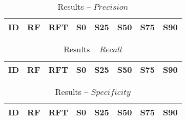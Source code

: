 \documentclass{llncs}
\begin{document}
\begin{table}[!ht]
\centering
\caption{Results -- $Precision$}
\begin{tabular}{r c c c c c c c}
  \hline
\textbf{ID} & \textbf{RF} & \textbf{RFT} & \textbf{S0} & \textbf{S25} & \textbf{S50} & \textbf{S75} & \textbf{S90}\\
    \hline
    
\end{tabular}
\end{table}

\begin{table}[!ht]
\centering
\caption{Results -- $Recall$}
\begin{tabular}{r c c c c c c c}
  \hline
\textbf{ID} & \textbf{RF} & \textbf{RFT} & \textbf{S0} & \textbf{S25} & \textbf{S50} & \textbf{S75} & \textbf{S90}\\
    \hline
    
\end{tabular}
\end{table}

\begin{table}[!ht]
\centering
\caption{Results -- $Specificity$}
\begin{tabular}{r c c c c c c c}
  \hline
\textbf{ID} & \textbf{RF} & \textbf{RFT} & \textbf{S0} & \textbf{S25} & \textbf{S50} & \textbf{S75} & \textbf{S90}\\
    \hline
    
\end{tabular}
\end{table}
\end{document}
